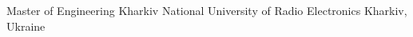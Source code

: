 \begin{cventries}
	\cventry
	{Master of Engineering}                              %
	{Kharkiv National University of Radio Electronics}   %
	{Kharkiv, Ukraine}                                   %
	{}                                                   %
	{}                                                   %
\end{cventries}
